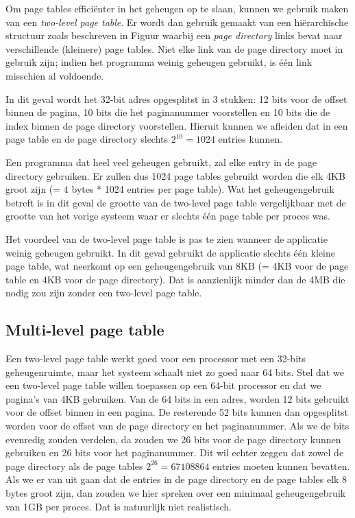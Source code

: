 Om page tables effici\"enter in het geheugen op te slaan, kunnen we gebruik maken van een \emph{two-level page table}. Er wordt dan gebruik gemaakt van een hi\"erarchische structuur zoals beschreven in Figuur  waarbij een \emph{page directory} links bevat naar verschillende (kleinere) page tables. Niet elke link van de page directory moet in gebruik zijn; indien het programma weinig geheugen gebruikt, is \'e\'en link misschien al voldoende.

In dit geval wordt het 32-bit adres opgesplitst in 3 stukken: 12 bits voor de offset binnen de pagina, 10 bits die het paginanummer voorstellen en 10 bits die de index binnen de page directory voorstellen. Hieruit kunnen we afleiden dat in een page table en de page directory slechts $2^{10} = 1024$ entries kunnen.


Een programma dat heel veel geheugen gebruikt, zal elke entry in de page directory gebruiken. Er zullen dus 1024 page tables gebruikt worden die elk 4KB groot zijn (= 4 bytes * 1024 entries per page table). Wat het geheugengebruik betreft is in dit geval de grootte van de two-level page table vergelijkbaar met de grootte van het vorige systeem waar er slechts \'e\'en page table per proces was.

Het voordeel van de two-level page table is pas te zien wanneer de applicatie weinig geheugen gebruikt. In dit geval gebruikt de applicatie slechts \'e\'en kleine page table, wat neerkomt op een geheugengebruik van 8KB (= 4KB voor de page table en 4KB voor de page directory). Dat is aanzienlijk minder dan de 4MB die nodig zou zijn zonder een two-level page table.

\subsection{Multi-level page table}

Een two-level page table werkt goed voor een processor met een 32-bits geheugenruimte, maar het systeem schaalt niet zo goed naar 64 bits. Stel dat we een two-level page table willen toepassen op een 64-bit processor en dat we pagina's van 4KB gebruiken. Van de 64 bits in een adres, worden 12 bits gebruikt voor de offset binnen in een pagina. De resterende 52 bits kunnen dan opgesplitst worden voor de offset van de page directory en het paginanummer. Als we de bits evenredig zouden verdelen, da zouden we 26 bits voor de page directory kunnen gebruiken en 26 bits voor het paginanummer. Dit wil echter zeggen dat zowel de page directory als de page tables $2^{26} = 67108864$ entries moeten kunnen bevatten. Als we er van uit gaan dat de entries in de page directory en de page tables elk 8 bytes groot zijn, dan zouden we hier spreken over een minimaal geheugengebruik van 1GB per proces. Dat is natuurlijk niet realistisch.

